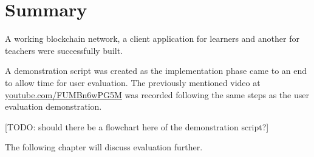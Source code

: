 \section*{Summary}

A working blockchain network, a client application for learners and another for teachers 
were successfully built. 

A demonstration script was created as the implementation phase came to an end to allow 
time for user evaluation. The previously mentioned video at 
\href{https://youtu.be/FUMBn6wPG5M}{\underline{youtube.com/FUMBn6wPG5M}} 
was recorded following the same steps as the user evaluation demonstration.

[TODO: should there be a flowchart here of the demonstration script?]

The following chapter will discuss evaluation further.